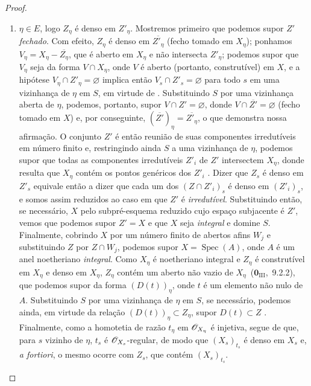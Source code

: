 \begin{proof}
\begin{enumerate}[label=\upshape{$\arabic{enumi}^\circ$}]
  \item\label{IV.9.5.3.case2} $\eta\in E$, logo $Z_\eta$ é denso em $Z'_\eta$.
  Mostremos primeiro que podemos supor $Z'$ \emph{fechado}.
  Com efeito, $Z_\eta$ é denso em $\overline{Z'_\eta}$ (fecho tomado em $X_\eta$); ponhamos $V_\eta=X_\eta-\overline{Z_\eta}$, que é aberto em $X_\eta$ e não intersecta $Z'_\eta$; podemos supor que $V_\eta$ seja da forma $V\cap X_\eta$, onde $V$ é aberto (portanto, construtível) em $X$, e a hipótese $V_\eta\cap Z'_\eta=\varnothing$ implica então $V_s\cap Z'_s=\varnothing$ para todo $s$ em uma vizinhança de $\eta$ em $S$, em virtude de .
  Substituindo $S$ por uma vizinhança aberta de $\eta$, podemos, portanto, supor $V\cap Z'=\varnothing$, donde $V\cap\overline{Z'}=\varnothing$ (fecho tomado em $X$) e, por conseguinte, $(\overline{Z'})_\eta=\overline{Z'_\eta}$, o que demonstra nossa afirmação.
  O conjunto $Z'$ é então reunião de suas componentes irredutíveis em número finito e, restringindo ainda $S$ a uma vizinhança de $\eta$, podemos supor que todas as componentes irredutíveis $Z'_i$ de $Z'$ intersectem $X_\eta$, donde resulta que $X_\eta$ contém os pontos genéricos dos $Z'_i$ .
  Dizer que $Z_s$ é denso em $Z'_s$ equivale então a dizer que cada um dos $(Z\cap Z'_i)_s$ é denso em $(Z'_i)_s$, e somos assim reduzidos ao caso em que $Z'$ é \emph{irredutível}.
  Substituindo então, se necessário, $X$ pelo subpré-esquema reduzido cujo espaço subjacente é $Z'$, vemos que podemos supor $Z'=X$ e que $X$ seja \emph{integral} e domine $S$.
  Finalmente, cobrindo $X$ por um número finito de abertos afins $W_j$ e substituindo $Z$ por $Z\cap W_j$, podemos supor $X=\operatorname{Spec}(A)$, onde $A$ é um anel noetheriano \emph{integral}.
  Como $X_\eta$ é noetheriano integral e $Z_\eta$ é construtível em $X_\eta$ e denso em $X_\eta$, $Z_\eta$ contém um aberto não vazio de $X_\eta$~($\mathbf{0}_{\mathrm{III}}$,~9.2.2), que podemos supor da forma $(D(t))_\eta$, onde $t$ é um elemento não nulo de $A$.
  Substituindo $S$ por uma vizinhança de $\eta$ em $S$, se necessário, podemos ainda, em virtude da relação $(D(t))_\eta\subset Z_\eta$, supor $D(t)\subset Z$ .
  Finalmente, como a homotetia de razão $t_\eta$ em $\mathscr{O}_{X_\eta}$ é injetiva, segue de  que, para $s$ vizinho de $\eta$, $t_s$ é $\mathscr{O}_{X_s}$-regular, de modo que $(X_s)_{t_s}$ é denso em $X_s$ e, \emph{a fortiori}, o mesmo ocorre com $Z_s$, que contém $(X_s)_{t_s}$.
\end{enumerate}
\end{proof}

